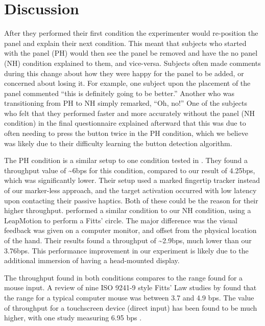 \section{Discussion}

After they performed their first condition the experimenter would re-position the panel and explain their next condition.
This meant that subjects who started with the panel (PH) would then see the panel be removed and have the no panel (NH) condition explained to them, and vice-versa.
Subjects often made comments during this change about how they were happy for the panel to be added, or concerned about losing it.
For example, one subject upon the placement of the panel commented ``this is definitely going to be better.''
Another who was transitioning from PH to NH simply remarked, ``Oh, no!''
One of the subjects who felt that they performed faster and more accurately without the panel (NH condition) in the final questionnaire explained afterward that this was due to often needing to press the button twice in the PH condition, which we believe was likely due to their difficulty learning the button detection algorithm.

The PH condition is a similar setup to one condition tested in \citet{kohli_redirected_2012}.
They found a throughput value of \textasciitilde6bps for this condition, compared to our result of 4.25bps, which was significantly lower.
Their setup used a marked fingertip tracker instead of our marker-less approach, and the target activation occurred with low latency upon contacting their passive haptics.
Both of these could be the reason for their higher throughput.
\citet{seixas_one_2015} performed a similar condition to our NH condition, using a LeapMotion to perform a Fitts' circle.
The major difference was the visual feedback was given on a computer monitor, and offset from the physical location of the hand.
Their results found a throughput of \textasciitilde2.9bps, much lower than our 3.76bps.
This performance improvement in our experiment is likely due to the additional immersion of having a head-mounted display.

The throughput found in both conditions compares to the range found for a mouse input.
A review of nine ISO 9241-9 style Fitts' Law studies by \citet{soukoreff_towards_2004} found that the range for a typical computer mouse was between 3.7 and 4.9 bps.
The value of throughput for a touchscreen device (direct input) has been found to be much higher, with one study measuring 6.95 bps \citep{mackenzie_fitts_2015}.

